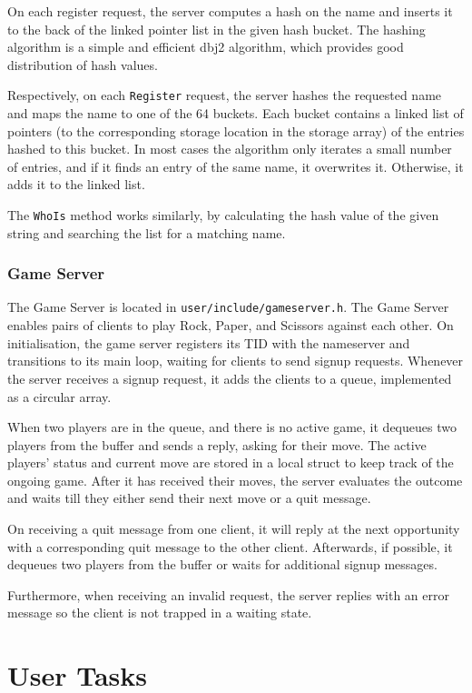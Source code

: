 \documentclass[12pt, titlepage]{article}
\begin{document}
    On each register request, the server computes a hash on the name and inserts it to the back of the linked pointer list in the given hash bucket. The hashing algorithm is a simple and efficient dbj2 algorithm, which provides good distribution of hash values.

    Respectively, on each \verb`Register` request, the server hashes the requested name and maps the name to one of the 64 buckets.
    Each bucket contains a linked list of pointers (to the corresponding storage location in the storage array) of the entries hashed to this bucket. In most cases the algorithm only iterates a small number of entries, and if it finds an entry of the same name, it overwrites it. Otherwise, it adds it to the linked list.

    The \verb`WhoIs` method works similarly, by calculating the hash value of the given string and searching the list for a matching name.

    \subsubsection{Game Server}
    The Game Server is located in \verb`user/include/gameserver.h`.
    The Game Server enables pairs of clients to play Rock, Paper, and Scissors against each other.
    On initialisation, the game server registers its TID with the nameserver and transitions to its main loop, waiting for clients to send signup requests.
    Whenever the server receives a signup request, it adds the clients to a queue, implemented as a circular array.

    When two players are in the queue, and there is no active game, it dequeues two players from the buffer and sends a reply, asking for their move.
    The active players' status and current move are stored in a local struct to keep track of the ongoing game.
    After it has received their moves, the server evaluates the outcome and waits till they either send their next move or a quit message.

    On receiving a quit message from one client, it will reply at the next opportunity with a corresponding quit message to the other client.
    Afterwards, if possible, it dequeues two players from the buffer or waits for additional signup messages.

    Furthermore, when receiving an invalid request, the server replies with an error message so the client is not trapped in a waiting state.

    \section{User Tasks}
\end{document}
